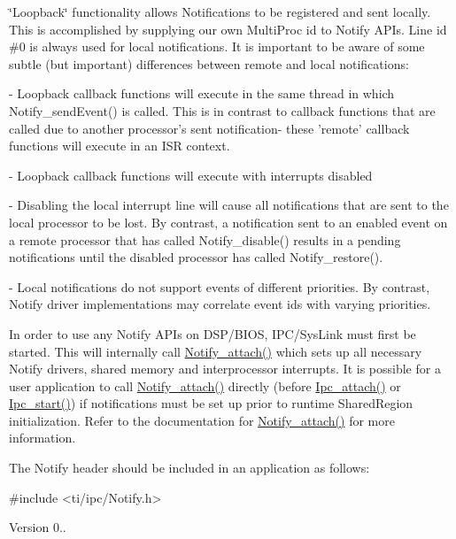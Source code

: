 \char`\"{}\-Loopback\char`\"{} functionality allows Notifications to be registered and sent locally. This is accomplished by supplying our own Multi\-Proc id to Notify A\-P\-Is. Line id \#0 is always used for local notifications. It is important to be aware of some subtle (but important) differences between remote and local notifications\-: \begin{DoxyVerb}- Loopback callback functions will execute in the same thread in which
  Notify_sendEvent() is called.  This is in contrast to callback
  functions that are called due to another processor's sent
  notification- these 'remote' callback functions will execute in an
  ISR context.

- Loopback callback functions will execute with interrupts disabled

- Disabling the local interrupt line will cause all notifications that
  are sent to the local processor to be lost.  By contrast, a
  notification sent to an enabled event on a remote processor that has
  called Notify_disable() results in a pending notifications until the
  disabled processor has called Notify_restore().

- Local notifications do not support events of different priorities.
  By contrast, Notify driver implementations may correlate event ids
  with varying priorities.
\end{DoxyVerb}


In order to use any Notify A\-P\-Is on D\-S\-P/\-B\-I\-O\-S, I\-P\-C/\-Sys\-Link must first be started. This will internally call \hyperlink{_notify_8h_a2d6e7fc00357b58ddc2a860e6bd4bf80}{Notify\-\_\-attach()} which sets up all necessary Notify drivers, shared memory and interprocessor interrupts. It is possible for a user application to call \hyperlink{_notify_8h_a2d6e7fc00357b58ddc2a860e6bd4bf80}{Notify\-\_\-attach()} directly (before \hyperlink{_ipc_8h_a170f84915df79377080be708302bcb08}{Ipc\-\_\-attach()} or \hyperlink{_ipc_8h_aca550c6a5498637cfec7b0f4e6d07828}{Ipc\-\_\-start()}) if notifications must be set up prior to runtime Shared\-Region initialization. Refer to the documentation for \hyperlink{_notify_8h_a2d6e7fc00357b58ddc2a860e6bd4bf80}{Notify\-\_\-attach()} for more information.

The Notify header should be included in an application as follows\-: 
\begin{DoxyCode}
\textcolor{preprocessor}{    #include <ti/ipc/Notify.h>}
\end{DoxyCode}


\begin{DoxyVersion}{Version}
0.. 


\end{DoxyVersion}
